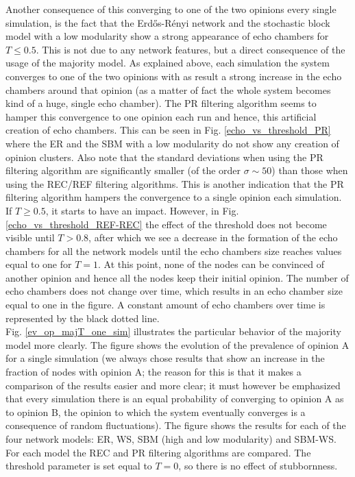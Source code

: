 \documentclass[11 pt , letterpaper , twoside , openright]{book}
\begin{document}
Another consequence of this converging to one of the two opinions every single simulation, is the fact that the Erd\H{o}s-R\'{e}nyi network and the stochastic block model with a low modularity show a strong appearance of echo chambers for $T \leqslant 0.5$. This is not due to any network features, but a direct consequence of the usage of the majority model. As explained above, each simulation the system converges to one of the two opinions with as result a strong increase in the echo chambers around that opinion (as a matter of fact the whole system becomes kind of a huge, single echo chamber). The PR filtering algorithm seems to hamper this convergence to one opinion each run and hence, this artificial creation of echo chambers. This can be seen in Fig. \ref{echo_vs_threshold_PR} where the ER and the SBM with a low modularity do not show any creation of opinion clusters. Also note that the standard deviations when using the PR filtering algorithm are significantly smaller (of the order $\sigma \sim 50$) than those when using the REC/REF filtering algorithms. This is another indication that the PR filtering algorithm hampers the convergence to a single opinion each simulation. If $T \geqslant 0.5$, it starts to have an impact. However, in Fig. \ref{echo_vs_threshold_REF-REC} the effect of the threshold does not become visible until $T > 0.8$, after which we see a decrease in the formation of the echo chambers for all the network models until the echo chambers size reaches values equal to one for $T=1$. At this point, none of the nodes can be convinced of another opinion and hence all the nodes keep their initial opinion. The number of echo chambers does not change over time, which results in an echo chamber size equal to one in the figure. A constant amount of echo chambers over time is represented by the black dotted line.\\
\newline
Fig. \ref{ev_op_majT_one_sim} illustrates the particular behavior of the majority model more clearly. The figure shows the evolution of the prevalence of opinion A for a single simulation (we always chose results that show an increase in the fraction of nodes with opinion A; the reason for this is that it makes a comparison of the results easier and more clear; it must however be emphasized that every simulation there is an equal probability of converging to opinion A as to opinion B, the opinion to which the system eventually converges is a consequence of random fluctuations). The figure shows the results for each of the four network models: ER, WS, SBM (high and low modularity) and SBM-WS. For each model the REC and PR filtering algorithms are compared. The threshold parameter is set equal to $T=0$, so there is no effect of stubbornness.\\
\end{document}
